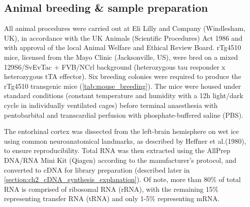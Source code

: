 \subsection{Animal breeding \& sample preparation}
\label{sec: animalbreeding_sample preparation}
All animal procedures were carried out at Eli Lilly and Company (Windlesham, UK), in accordance with the UK Animals (Scientific Procedures) Act 1986 and with approval of the local Animal Welfare and Ethical Review Board. rTg4510 mice, licensed from the Mayo Clinic (Jacksonville, US), were bred on a mixed 129S6/SvEvTac + FVB/NCrl background (heterozygous tau responder x heterozygous tTA effector)\cite{Castanho2020}. Six breeding colonies were required to produce the rTg4510 transgenic mice (\cref{tab:mouse_breeding}). The mice were housed under standard conditions (constant temperature and humidity with a 12h light/dark cycle in individually ventilated cages) before terminal anaesthesia with pentobarbital and transcardial perfusion with phosphate-buffered saline (PBS)\cite{Castanho2020}.

The entorhinal cortex was dissected from the left-brain hemisphere on wet ice using common neuroanatomical landmarks, as described by Heffner et al.(1980)\cite{Heffner1980}, to ensure reproducibility. Total RNA was then extracted\cite{Castanho2020} using the AllPrep DNA/RNA Mini Kit (Qiagen) according to the manufacturer's protocol, and converted to cDNA for library preparation (described later in \cref{section:ch2_cDNA_synthesis_explanation}). Of note, more than 80\% of total RNA is comprised of ribosomal RNA (rRNA), with the remaining 15\% representing transfer RNA (tRNA) and only 1-5\% representing mRNA. 


